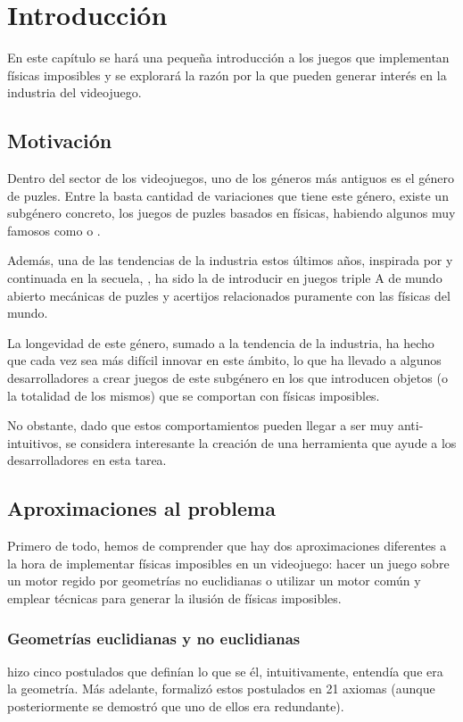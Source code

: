 \chapter{Introducción}
\label{cap:introduccion}
\begin{resumen}
	En este capítulo se hará una pequeña introducción a los juegos que implementan físicas imposibles y se explorará la razón por la que pueden generar interés en la industria del videojuego.
\end{resumen}

\section{Motivación}
Dentro del sector de los videojuegos, uno de los géneros más antiguos es el género de puzles. Entre la basta cantidad de variaciones que tiene este género, existe un subgénero concreto, los juegos de puzles basados en físicas, habiendo algunos muy famosos como \cite{portal} o \citet{portal2}.

Además, una de las tendencias de la industria estos últimos años, inspirada por \cite{zelda} y continuada en la secuela, \cite{zelda2}, ha sido la de introducir en juegos triple A de mundo abierto mecánicas de puzles y acertijos relacionados puramente con las físicas del mundo.

La longevidad de este género, sumado a la tendencia de la industria, ha hecho que cada vez sea más difícil innovar en este ámbito, lo que ha llevado a algunos desarrolladores a crear juegos de este subgénero en los que introducen objetos (o la totalidad de los mismos) que se comportan con físicas imposibles.

No obstante, dado que estos comportamientos pueden llegar a ser muy anti-intuitivos, se considera interesante la creación de una herramienta que ayude a los desarrolladores en esta tarea.


\section{Aproximaciones al problema}
Primero de todo, hemos de comprender que hay dos aproximaciones diferentes a la hora de implementar físicas imposibles en un videojuego: hacer un juego sobre un motor regido por geometrías no euclidianas o utilizar un motor común y emplear técnicas para generar la ilusión de físicas imposibles.

\subsection{Geometrías euclidianas y no euclidianas}
\cite{elementos} hizo cinco postulados que definían lo que se él, intuitivamente, entendía que era la geometría. Más adelante, \cite{hilbert} formalizó estos postulados en 21 axiomas (aunque posteriormente se demostró que uno de ellos era redundante).

